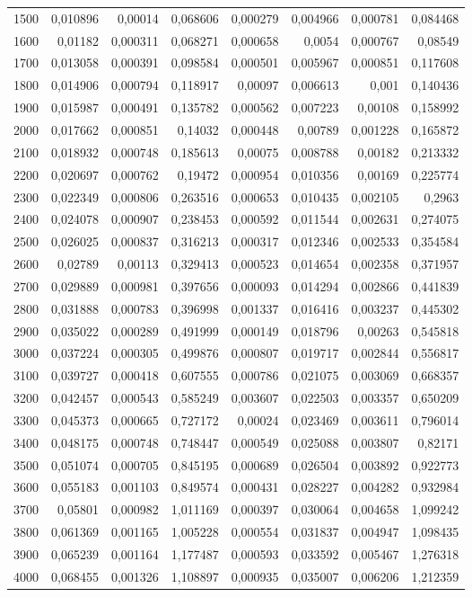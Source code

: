 \begin{tabular}{r r r r r r r r}
1500 & 0,010896 & 0,00014 & 0,068606 & 0,000279 & 0,004966 & 0,000781 & 0,084468 \\
1600 & 0,01182 & 0,000311 & 0,068271 & 0,000658 & 0,0054 & 0,000767 & 0,08549 \\
1700 & 0,013058 & 0,000391 & 0,098584 & 0,000501 & 0,005967 & 0,000851 & 0,117608 \\
1800 & 0,014906 & 0,000794 & 0,118917 & 0,00097 & 0,006613 & 0,001 & 0,140436 \\
1900 & 0,015987 & 0,000491 & 0,135782 & 0,000562 & 0,007223 & 0,00108 & 0,158992 \\
2000 & 0,017662 & 0,000851 & 0,14032 & 0,000448 & 0,00789 & 0,001228 & 0,165872 \\
2100 & 0,018932 & 0,000748 & 0,185613 & 0,00075 & 0,008788 & 0,00182 & 0,213332 \\
2200 & 0,020697 & 0,000762 & 0,19472 & 0,000954 & 0,010356 & 0,00169 & 0,225774 \\
2300 & 0,022349 & 0,000806 & 0,263516 & 0,000653 & 0,010435 & 0,002105 & 0,2963 \\
2400 & 0,024078 & 0,000907 & 0,238453 & 0,000592 & 0,011544 & 0,002631 & 0,274075 \\
2500 & 0,026025 & 0,000837 & 0,316213 & 0,000317 & 0,012346 & 0,002533 & 0,354584 \\
2600 & 0,02789 & 0,00113 & 0,329413 & 0,000523 & 0,014654 & 0,002358 & 0,371957 \\
2700 & 0,029889 & 0,000981 & 0,397656 & 0,000093 & 0,014294 & 0,002866 & 0,441839 \\
2800 & 0,031888 & 0,000783 & 0,396998 & 0,001337 & 0,016416 & 0,003237 & 0,445302 \\
2900 & 0,035022 & 0,000289 & 0,491999 & 0,000149 & 0,018796 & 0,00263 & 0,545818 \\
3000 & 0,037224 & 0,000305 & 0,499876 & 0,000807 & 0,019717 & 0,002844 & 0,556817 \\
3100 & 0,039727 & 0,000418 & 0,607555 & 0,000786 & 0,021075 & 0,003069 & 0,668357 \\
3200 & 0,042457 & 0,000543 & 0,585249 & 0,003607 & 0,022503 & 0,003357 & 0,650209 \\
3300 & 0,045373 & 0,000665 & 0,727172 & 0,00024 & 0,023469 & 0,003611 & 0,796014 \\
3400 & 0,048175 & 0,000748 & 0,748447 & 0,000549 & 0,025088 & 0,003807 & 0,82171 \\
3500 & 0,051074 & 0,000705 & 0,845195 & 0,000689 & 0,026504 & 0,003892 & 0,922773 \\
3600 & 0,055183 & 0,001103 & 0,849574 & 0,000431 & 0,028227 & 0,004282 & 0,932984 \\
3700 & 0,05801 & 0,000982 & 1,011169 & 0,000397 & 0,030064 & 0,004658 & 1,099242 \\
3800 & 0,061369 & 0,001165 & 1,005228 & 0,000554 & 0,031837 & 0,004947 & 1,098435 \\
3900 & 0,065239 & 0,001164 & 1,177487 & 0,000593 & 0,033592 & 0,005467 & 1,276318 \\
4000 & 0,068455 & 0,001326 & 1,108897 & 0,000935 & 0,035007 & 0,006206 & 1,212359 \\
\end{tabular}

